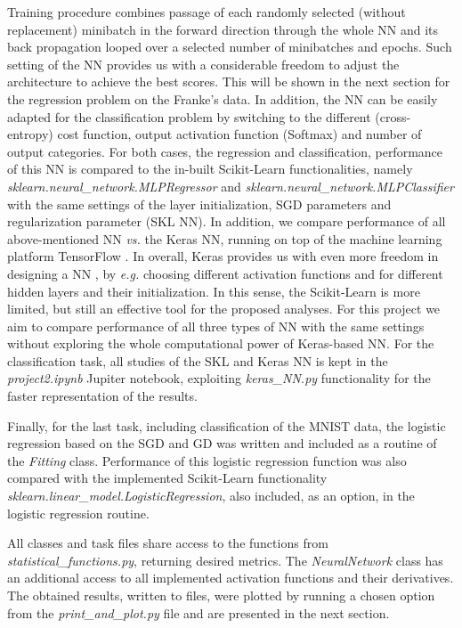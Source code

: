 \documentclass{emulateapj}
\begin{document}
Training procedure combines passage of each randomly selected (without replacement) minibatch in the forward direction through the whole NN and its back propagation looped over a selected number of minibatches and epochs. Such setting of the NN provides us with a considerable freedom to adjust the architecture to achieve the best scores. This will be shown in the next section for the regression problem on the Franke's data. In addition, the NN can be easily adapted for the classification problem by switching to the different (cross-entropy) cost function, output activation function (Softmax) and number of output categories. For both cases, the regression and classification, performance of this NN is compared to the in-built Scikit-Learn functionalities, namely \textit{sklearn.neural\_network.MLPRegressor} and \textit{sklearn.neural\_network.MLPClassifier} \cite{skl} with the same settings of the layer initialization, SGD parameters and regularization parameter (SKL NN). In addition, we compare performance of all above-mentioned NN \textit{vs.} the Keras NN, running on top of the machine learning platform TensorFlow \cite{keras}. In overall, Keras provides us with even more freedom in designing a NN , by \textit{e.g.} choosing different activation functions and for different hidden layers and their initialization. In this sense, the Scikit-Learn is more limited, but still an effective tool for the proposed analyses. For this project we aim to compare performance of all three types of NN with the same settings without exploring the whole computational power of Keras-based NN. For the classification task, all studies of the SKL and Keras NN is kept in the \textit{project2.ipynb} Jupiter notebook, exploiting \textit{keras\_NN.py} functionality for the faster representation of the results.  

Finally, for the last task, including classification of the MNIST data, the logistic regression based on the SGD and GD was written and included as a routine of the \textit{Fitting} class. Performance of this logistic regression function was also compared with the implemented Scikit-Learn functionality \textit{sklearn.linear\_model.LogisticRegression}, also included, as an option, in the logistic regression routine.


All classes and task files share access to the functions from \textit{statistical\_functions.py}, returning desired metrics. The \textit{NeuralNetwork} class has an additional access to all implemented activation functions and their derivatives. The obtained results, written to files, were plotted by running a chosen option from the \textit{print\_and\_plot.py} file and are presented in the next section.
\end{document}
